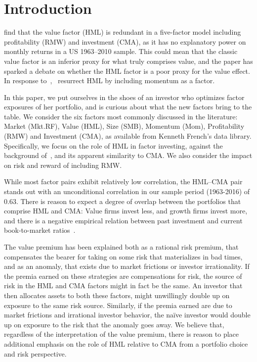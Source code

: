 \section{Introduction}
\textcite{FF2015} find that the value factor (HML) is redundant in a five-factor model including profitability (RMW) and investment (CMA), as it has no explanatory power on monthly returns in a US 1963–2010 sample. This could mean that the classic value factor is an inferior proxy for what truly comprises value, and the paper has sparked a debate on whether the HML factor is a poor proxy for the value effect. In response to~\textcite{FF2015},~\textcite{Asness2015} resurrect HML by including momentum as a factor.

In this paper, we put ourselves in the shoes of an investor who optimizes factor exposures of her portfolio, and is curious about what the new factors bring to the table. We consider the six factors most commonly discussed in the literature: Market (Mkt.RF), Value (HML), Size (SMB), Momentum (Mom), Profitability (RMW) and Investment (CMA), as available from Kenneth French's data library. Specifically, we focus on the role of HML in factor investing, against the background of~\textcite{FF2015,Asness2015}, and its apparent similarity to CMA. We also consider the impact on risk and reward of including RMW.

While most factor pairs exhibit relatively low correlation, the HML--CMA pair stands out with an unconditional correlation in our sample period (1963-2016) of 0.63. There is reason to expect a degree of overlap between the portfolios that comprise HML and CMA: Value firms invest less, and growth firms invest more, and there is a negative empirical relation between past investment and current book-to-market ratios~\autocite{Zhang2005,AndersonGarciaFeijoo2006}.

The value premium has been explained both as a rational risk premium, that compensates the bearer for taking on some risk that materializes in bad times, and as an anomaly, that exists due to market frictions or investor irrationality. If the premia earned on these strategies are compensations for risk, the source of risk in the HML and CMA factors might in fact be the same. An investor that then allocates assets to both these factors, might unwillingly double up on exposure to the same risk source. Similarly, if the premia earned are due to market frictions and irrational investor behavior, the naïve investor would double up on exposure to the risk that the anomaly goes away. We believe that, regardless of the interpretation of the value premium, there is reason to place additional emphasis on the role of HML relative to CMA from a portfolio choice and risk perspective.

